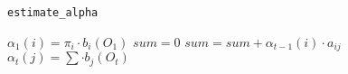 \begin{algorithm}
\caption{\texttt{estimate\_alpha}}
\label{koda:estimate_alpha}
\begin{algorithmic}
  \State $\alpha_1(i) = \pi_i \cdot b_i(O_1)$
\EndFor
{}
    \State $sum = 0$
      \State $sum = sum + \alpha_{t-1}(i) \cdot a_{ij}$
    \EndFor
    \State $\alpha_t(j) = \sum \cdot b_j(O_t)$
  \EndFor
\EndFor
\end{algorithmic}
\end{algorithm}
